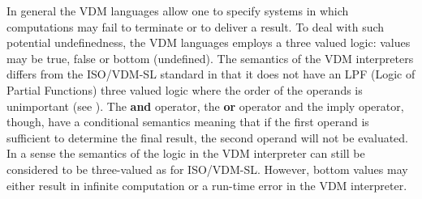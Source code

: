 \documentclass{overturerepchap}
\newcommand{\keyw}[1]{{\bf\ttfamily #1}}
\begin{document}
In general the VDM languages allow one to specify systems in
which computations may fail to terminate or to deliver a result. To
deal with such potential undefinedness, 
the VDM languages employs a three valued logic: values may be
true, false or bottom (undefined). 
The semantics of the VDM interpreters differs from the ISO/VDM-SL standard
in that it does
not have an LPF (Logic of Partial Functions) three valued logic where
the order of the operands is  
unimportant (see \cite{Jones90a}).  The \keyw{and} operator, the
\keyw{or} operator and the imply operator, though, have a conditional
semantics meaning that if the first operand is sufficient to determine
the final result, the second operand will not be evaluated. In a sense
the semantics of the logic in the VDM interpreter can still be considered
to be three-valued as for ISO/VDM-SL. However, bottom values may
either result in infinite computation or a run-time error in the
VDM interpreter.
\end{document}
